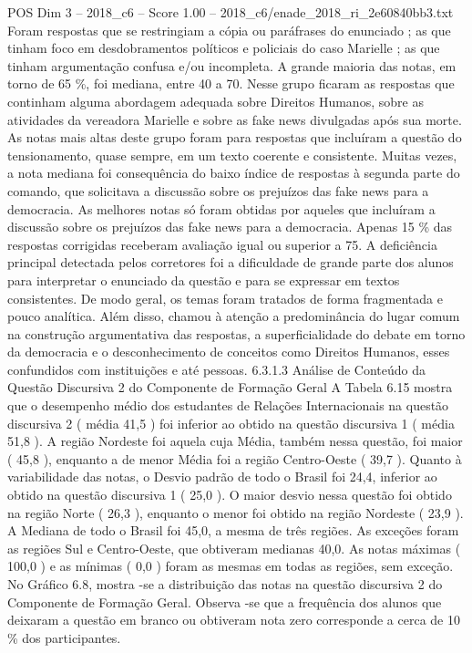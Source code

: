 \begin{textsample}{POS Dim 3 – 2018\_c6 – Score 1.00 – 2018\_c6/enade\_2018\_ri\_2e60840bb3.txt}
Foram respostas que se restringiam a cópia ou paráfrases do enunciado ; as que tinham foco em desdobramentos políticos e policiais do caso Marielle ; as que tinham argumentação confusa e/ou incompleta.
A grande maioria das notas, em torno de 65 \%, foi mediana, entre 40 a 70.
Nesse grupo ficaram as respostas que continham alguma abordagem adequada sobre Direitos Humanos, sobre as atividades da vereadora Marielle e sobre as fake news divulgadas após sua morte.
As notas mais altas deste grupo foram para respostas que incluíram a questão do tensionamento, quase sempre, em um texto coerente e consistente.
Muitas vezes, a nota mediana foi consequência do baixo índice de respostas à segunda parte do comando, que solicitava a discussão sobre os prejuízos das fake news para a democracia.
As melhores notas só foram obtidas por aqueles que incluíram a discussão sobre os prejuízos das fake news para a democracia.
Apenas 15 \% das respostas corrigidas receberam avaliação igual ou superior a 75.
A deficiência principal detectada pelos corretores foi a dificuldade de grande parte dos alunos para interpretar o enunciado da questão e para se expressar em textos consistentes.
De modo geral, os temas foram tratados de forma fragmentada e pouco analítica.
Além disso, chamou à atenção a predominância do lugar comum na construção argumentativa das respostas, a superficialidade do debate em torno da democracia e o desconhecimento de conceitos como Direitos Humanos, esses confundidos com instituições e até pessoas. 6.3.1.3 Análise de Conteúdo da Questão Discursiva 2 do Componente de Formação Geral A Tabela 6.15 mostra que o desempenho médio dos estudantes de Relações Internacionais na questão discursiva 2 ( média 41,5 ) foi inferior ao obtido na questão discursiva 1 ( média 51,8 ).
A região Nordeste foi aquela cuja Média, também nessa questão, foi maior ( 45,8 ), enquanto a de menor Média foi a região Centro-Oeste ( 39,7 ).
Quanto à variabilidade das notas, o Desvio padrão de todo o Brasil foi 24,4, inferior ao obtido na questão discursiva 1 ( 25,0 ).
O maior desvio nessa questão foi obtido na região Norte ( 26,3 ), enquanto o menor foi obtido na região Nordeste ( 23,9 ).
A Mediana de todo o Brasil foi 45,0, a mesma de três regiões.
As exceções foram as regiões Sul e Centro-Oeste, que obtiveram medianas 40,0.
As notas máximas ( 100,0 ) e as mínimas ( 0,0 ) foram as mesmas em todas as regiões, sem exceção.
No Gráfico 6.8, mostra -se a distribuição das notas na questão discursiva 2 do Componente de Formação Geral.
Observa -se que a frequência dos alunos que deixaram a questão em branco ou obtiveram nota zero corresponde a cerca de 10 \% dos participantes.

\end{textsample}
